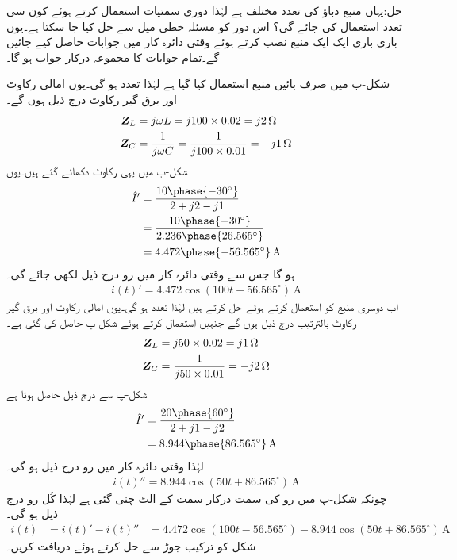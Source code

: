 حل:یہاں منبع دباؤ کی تعدد مختلف ہے لہٰذا دوری سمتیات استعمال کرتے ہوئے کون سی تعدد استعمال کی جائے گی؟ اس دور کو مسئلہ خطی میل سے حل کیا جا سکتا ہے۔یوں باری باری ایک ایک منبع نصب کرتے ہوئے وقتی دائرہ کار میں جوابات حاصل کیے جائیں گے۔تمام جوابات کا مجموعہ درکار جواب ہو گا۔

شکل-ب میں صرف بائیں منبع استعمال کیا گیا ہے لہٰذا تعدد  ہو گی۔یوں امالی رکاوٹ اور برق گیر رکاوٹ درج ذیل ہوں گے۔
\begin{align*}
{\ensuremath{{\boldsymbol{Z}}}}_L&=j\omega L=j 100\times 0.02=j2 \,\si{\ohm}\\
{{\boldsymbol{Z}}}_C&=\frac{1}{j \omega C}=\frac{1}{j 100 \times 0.01}=-j1 \,\si{\ohm}
\end{align*}
شکل-ب میں یہی رکاوٹ دکھائے گئے ہیں۔یوں
\begin{align*}
\hat{I}'&=\frac{10\phase{-30^{\circ}}}{2+j2-j1}\\
&=\frac{10\phase{-30^{\circ}}}{2.236\phase{26.565^{\circ}}}\\
&=4.472\phase{-56.565^{\circ}}\,\si{\ampere}
\end{align*}
ہو گا جس سے وقتی دائرہ کار میں رو درج ذیل لکھی جائے گی۔
\begin{align*}
i(t)'=4.472\cos(100t-56.565^{\circ})\,\si{\ampere}
\end{align*}
اب دوسری منبع کو استعمال کرتے ہوئے حل کرتے ہیں لہٰذا تعدد  ہو گی۔یوں امالی رکاوٹ اور برق گیر رکاوٹ بالترتیب درج ذیل ہوں گے جنہیں استعمال کرتے ہوئے شکل-پ حاصل کی گئی ہے۔
\begin{align*}
{\ensuremath{{\boldsymbol{Z}}}}_L&=j50\times 0.02=j1 \,\si{\ohm}\\
{{\boldsymbol{Z}}}_C&=\frac{1}{j50\times 0.01}=-j2\,\si{\ohm}
\end{align*}
شکل-پ سے درج ذیل حاصل ہوتا ہے
\begin{align*}
\hat{I}'&=\frac{20\phase{60^{\circ}}}{2+j1-j2}\\
&=8.944\phase{86.565^{\circ}}\,\si{\ampere}
\end{align*}
لہٰذا وقتی دائرہ کار میں رو درج ذیل ہو گی۔
\begin{align*}
i(t)''=8.944\cos(50t+86.565^{\circ})\,\si{\ampere}
\end{align*}
چونکہ شکل-پ میں رو کی سمت درکار سمت کے الٹ چنی گئی ہے لہٰذا کُل رو درج ذیل ہو گی۔
\begin{align*}
i(t)&=i(t)'-i(t)''
&=4.472\cos(100t-56.565^{\circ})-8.944\cos(50t+86.565^{\circ})\, \si{\ampere}
\end{align*}
شکل  کو ترکیب جوڑ سے حل کرتے ہوئے  دریافت کریں۔

